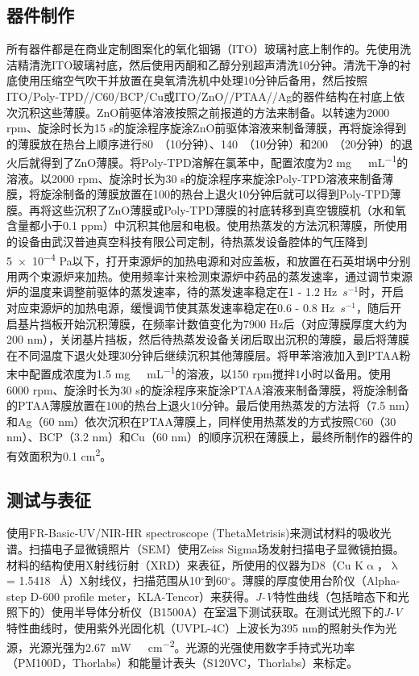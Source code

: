 \documentclass[forlib]{WHUMaster}   %
\def\degree{${}^{\circ}$} %
\begin{document}
{\subsection{器件制作}
所有器件都是在商业定制图案化的氧化铟锡（ITO）玻璃衬底上制作的。先使用洗洁精清洗ITO玻璃衬底，然后使用丙酮和乙醇分别超声清洗10分钟。清洗干净的衬底使用压缩空气吹干并放置在臭氧清洗机中处理10分钟后备用，然后按照ITO/Poly-TPD//C60/BCP/Cu或ITO/ZnO//PTAA//Ag的器件结构在衬底上依次沉积这些薄膜。ZnO前驱体溶液按照之前报道的方法来制备\cite{RN1}。以转速为2000 rpm、旋涂时长为15 s的旋涂程序旋涂ZnO前驱体溶液来制备薄膜，再将旋涂得到的薄膜放在热台上顺序进行80\textcelsius\ （10分钟）、140\textcelsius\ （10分钟）和200\textcelsius\ （20分钟）的退火后就得到了ZnO薄膜。将Poly-TPD溶解在氯苯中，配置浓度为2 \si{mg\ mL^{-1}}的溶液。以2000 rpm、旋涂时长为30 s的旋涂程序来旋涂Poly-TPD溶液来制备薄膜，将旋涂制备的薄膜放置在100\textcelsius 的热台上退火10分钟后就可以得到Poly-TPD薄膜。再将这些沉积了ZnO薄膜或Poly-TPD薄膜的衬底转移到真空镀膜机（水和氧含量都小于0.1 ppm）中沉积其他层和电极。使用热蒸发的方法沉积薄膜，所使用的设备由武汉普迪真空科技有限公司定制，待热蒸发设备腔体的气压降到\num{5e-4} \si{Pa}以下，打开束源炉的加热电源和对应盖板，和放置在石英坩埚中分别用两个束源炉来加热。使用频率计来检测束源炉中药品的蒸发速率，通过调节束源炉的温度来调整前驱体的蒸发速率，待的蒸发速率稳定在1 - 1.2 Hz\ $\si{s^{-1}}$时，开启对应束源炉的加热电源，缓慢调节使其蒸发速率稳定在0.6 - 0.8 Hz\ $\si{s^{-1}}$，随后开启基片挡板开始沉积薄膜，在频率计数值变化为7900 Hz后（对应薄膜厚度大约为200 nm），关闭基片挡板，然后待热蒸发设备关闭后取出沉积的薄膜，最后将薄膜在不同温度下退火处理30分钟后继续沉积其他薄膜层。将甲苯溶液加入到PTAA粉末中配置成浓度为1.5 \si{mg\ mL^{-1}}的溶液，以150 rpm搅拌1小时以备用。使用6000 rpm、旋涂时长为30 s的旋涂程序来旋涂PTAA溶液来制备薄膜，将旋涂制备的PTAA薄膜放置在100\textcelsius 的热台上退火10分钟。最后使用热蒸发的方法将（7.5 nm）和Ag（60 nm）依次沉积在PTAA薄膜上，同样使用热蒸发的方式按照C60（30 nm）、BCP（3.2 nm）和Cu（60 nm）的顺序沉积在薄膜上，最终所制作的器件的有效面积为0.1 \si{cm^2}。

\subsection{测试与表征}

使用FR-Basic-UV/NIR-HR spectroscope (ThetaMetrisis)来测试材料的吸收光谱。扫描电子显微镜照片（SEM）使用Zeiss Sigma场发射扫描电子显微镜拍摄。材料的结构使用X射线衍射（XRD）来表征，所使用的仪器为D8（Cu K$\upalpha$，$\uplambda$ = 1.5418 \ {\AA}）X射线仪，扫描范围从10{\degree}到60{\degree}。薄膜的厚度使用台阶仪（Alpha-step D-600 profile meter，KLA-Tencor）来获得。\emph{J-V}特性曲线（包括暗态下和光照下的）使用半导体分析仪（B1500A）在室温下测试获取。在测试光照下的\emph{J-V}特性曲线时，使用紫外光固化机（UVPL-4C）上波长为395 nm的照射头作为光源，光源光强为2.67\ \si{mW \ cm^{-2}}。光源的光强使用数字手持式光功率（PM100D，Thorlabs）和能量计表头（S120VC，Thorlabs）来标定。

}
\end{document}
